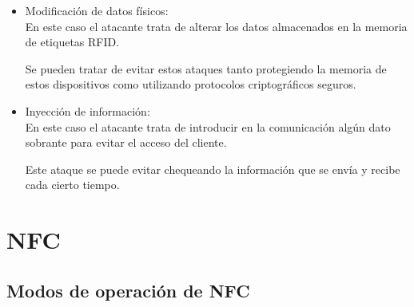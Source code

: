 \documentclass[12pt,a4paper,onecolumn,oneside]{report}
\begin{document}
\begin{itemize}
\item Modificación de datos físicos:\\
En este caso el atacante trata de alterar los datos almacenados en la memoria de etiquetas RFID. 

Se pueden tratar de evitar estos ataques tanto protegiendo la memoria de estos dispositivos como utilizando protocolos criptográficos seguros. 

\item Inyección de información:\\
En este caso el atacante trata de introducir en la comunicación algún dato sobrante para evitar el acceso del cliente. 

Este ataque se puede evitar chequeando la información que se envía y recibe cada cierto tiempo.


\end{itemize}




\section{NFC}

\subsection{Modos de operación de NFC}
\end{document}
